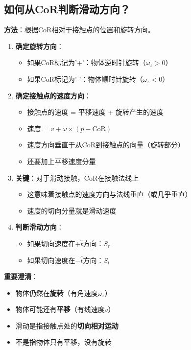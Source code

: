 \documentclass[12pt,a4paper]{article}
\begin{document}
\subsection{如何从CoR判断滑动方向？}

\textbf{方法}：根据CoR相对于接触点的位置和旋转方向。

\begin{enumerate}
\item \textbf{确定旋转方向}：
   \begin{itemize}
   \item 如果CoR标记为'+'：物体逆时针旋转（$\omega_z > 0$）
   \item 如果CoR标记为'-'：物体顺时针旋转（$\omega_z < 0$）
   \end{itemize}

\item \textbf{确定接触点的速度方向}：
   \begin{itemize}
   \item 接触点的速度 = 平移速度 + 旋转产生的速度
   \item 速度 = $v + \omega \times (p - \text{CoR})$
   \item 速度方向垂直于从CoR到接触点的向量（旋转部分）
   \item 还要加上平移速度分量
   \end{itemize}

\item \textbf{关键}：对于滑动接触，CoR在接触法线上
   \begin{itemize}
   \item 这意味着接触点的速度方向与法线垂直（或几乎垂直）
   \item 速度的切向分量就是滑动速度
   \end{itemize}

\item \textbf{判断滑动方向}：
   \begin{itemize}
   \item 如果切向速度在$+\hat{t}$方向：$S_r$
   \item 如果切向速度在$-\hat{t}$方向：$S_l$
   \end{itemize}
\end{enumerate}

\textbf{重要澄清}：
\begin{itemize}
\item 物体仍然在\textbf{旋转}（有角速度$\omega_z$）
\item 物体可能还有\textbf{平移}（有线速度$v$）
\item 滑动是指接触点处的\textbf{切向相对运动}
\item 不是指物体只有平移，没有旋转
\end{itemize}
\end{document}

